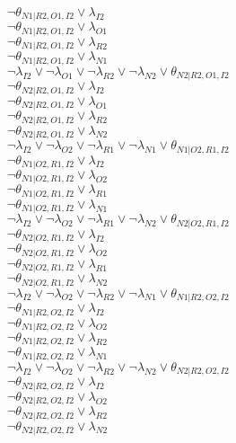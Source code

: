$\neg\theta_{N1|R2,O1,I2} \vee \lambda_{I2}$\\
$\neg\theta_{N1|R2,O1,I2} \vee \lambda_{O1}$\\
$\neg\theta_{N1|R2,O1,I2} \vee \lambda_{R2}$\\
$\neg\theta_{N1|R2,O1,I2} \vee \lambda_{N1}$\\
$\neg\lambda_{I2} \vee \neg\lambda_{O1} \vee \neg\lambda_{R2} \vee \neg\lambda_{N2} \vee \theta_{N2|R2,O1,I2}$\\
$\neg\theta_{N2|R2,O1,I2} \vee \lambda_{I2}$\\
$\neg\theta_{N2|R2,O1,I2} \vee \lambda_{O1}$\\
$\neg\theta_{N2|R2,O1,I2} \vee \lambda_{R2}$\\
$\neg\theta_{N2|R2,O1,I2} \vee \lambda_{N2}$\\
$\neg\lambda_{I2} \vee \neg\lambda_{O2} \vee \neg\lambda_{R1} \vee \neg\lambda_{N1} \vee \theta_{N1|O2,R1,I2}$\\
$\neg\theta_{N1|O2,R1,I2} \vee \lambda_{I2}$\\
$\neg\theta_{N1|O2,R1,I2} \vee \lambda_{O2}$\\
$\neg\theta_{N1|O2,R1,I2} \vee \lambda_{R1}$\\
$\neg\theta_{N1|O2,R1,I2} \vee \lambda_{N1}$\\
$\neg\lambda_{I2} \vee \neg\lambda_{O2} \vee \neg\lambda_{R1} \vee \neg\lambda_{N2} \vee \theta_{N2|O2,R1,I2}$\\
$\neg\theta_{N2|O2,R1,I2} \vee \lambda_{I2}$\\
$\neg\theta_{N2|O2,R1,I2} \vee \lambda_{O2}$\\
$\neg\theta_{N2|O2,R1,I2} \vee \lambda_{R1}$\\
$\neg\theta_{N2|O2,R1,I2} \vee \lambda_{N2}$\\
$\neg\lambda_{I2} \vee \neg\lambda_{O2} \vee \neg\lambda_{R2} \vee \neg\lambda_{N1} \vee \theta_{N1|R2,O2,I2}$\\
$\neg\theta_{N1|R2,O2,I2} \vee \lambda_{I2}$\\
$\neg\theta_{N1|R2,O2,I2} \vee \lambda_{O2}$\\
$\neg\theta_{N1|R2,O2,I2} \vee \lambda_{R2}$\\
$\neg\theta_{N1|R2,O2,I2} \vee \lambda_{N1}$\\
$\neg\lambda_{I2} \vee \neg\lambda_{O2} \vee \neg\lambda_{R2} \vee \neg\lambda_{N2} \vee \theta_{N2|R2,O2,I2}$\\
$\neg\theta_{N2|R2,O2,I2} \vee \lambda_{I2}$\\
$\neg\theta_{N2|R2,O2,I2} \vee \lambda_{O2}$\\
$\neg\theta_{N2|R2,O2,I2} \vee \lambda_{R2}$\\
$\neg\theta_{N2|R2,O2,I2} \vee \lambda_{N2}$\\
